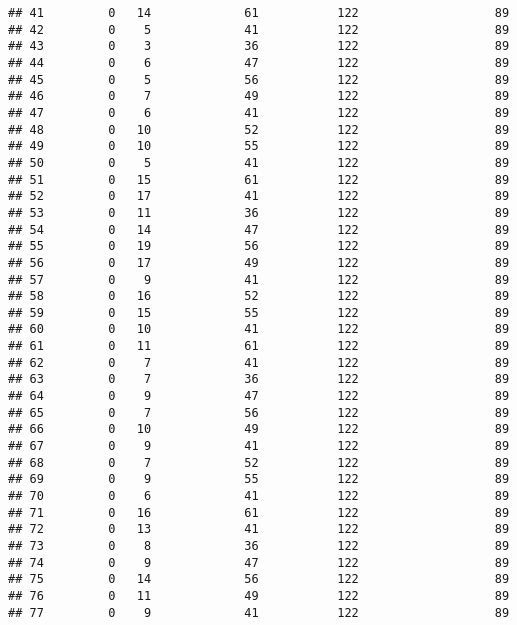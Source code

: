 \documentclass[]{article}
\begin{document}
\begin{verbatim}
## 41         0   14             61           122                   89
## 42         0    5             41           122                   89
## 43         0    3             36           122                   89
## 44         0    6             47           122                   89
## 45         0    5             56           122                   89
## 46         0    7             49           122                   89
## 47         0    6             41           122                   89
## 48         0   10             52           122                   89
## 49         0   10             55           122                   89
## 50         0    5             41           122                   89
## 51         0   15             61           122                   89
## 52         0   17             41           122                   89
## 53         0   11             36           122                   89
## 54         0   14             47           122                   89
## 55         0   19             56           122                   89
## 56         0   17             49           122                   89
## 57         0    9             41           122                   89
## 58         0   16             52           122                   89
## 59         0   15             55           122                   89
## 60         0   10             41           122                   89
## 61         0   11             61           122                   89
## 62         0    7             41           122                   89
## 63         0    7             36           122                   89
## 64         0    9             47           122                   89
## 65         0    7             56           122                   89
## 66         0   10             49           122                   89
## 67         0    9             41           122                   89
## 68         0    7             52           122                   89
## 69         0    9             55           122                   89
## 70         0    6             41           122                   89
## 71         0   16             61           122                   89
## 72         0   13             41           122                   89
## 73         0    8             36           122                   89
## 74         0    9             47           122                   89
## 75         0   14             56           122                   89
## 76         0   11             49           122                   89
## 77         0    9             41           122                   89

\end{verbatim}
\end{document}
